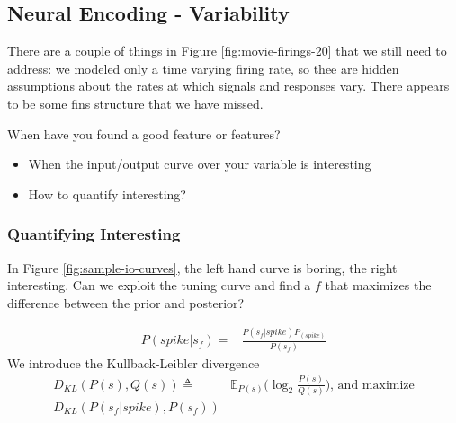 \documentclass[]{article}
\begin{document}
\subsection{Neural Encoding - Variability}

There are a couple of things in Figure \ref{fig:movie-firings-20} that we still need to address: we modeled only a time varying firing rate, so thee are hidden assumptions about the rates at which signals and responses vary. There appears to be some fins structure that we have missed.

When have you found a good feature or features?
\begin{itemize}
	\item When the input/output curve over your variable is interesting
	\item How to quantify interesting?
\end{itemize}

\subsubsection{Quantifying Interesting}
In Figure \ref{fig:sample-io-curves}, the left hand curve is boring, the right interesting. Can we exploit the tuning curve and find a $f$ that maximizes the difference between the prior and posterior?

\begin{align*}
	P(spike\vert s_f) =&\frac{ P(s_f\vert spike) P_({spike})}{P(s_f)}
\end{align*}
 We introduce the Kullback-Leibler divergence
\begin{align*}
		D_{KL}(P(s),Q(s))\triangleq&\mathbb{E}_{P(s)} \Big(\log_2 \frac{P(s)}{Q(s)}\Big) \text{, and maximize}\\
		D_{KL}(P(s_f|spike),P(s_f))
\end{align*}
\end{document}
